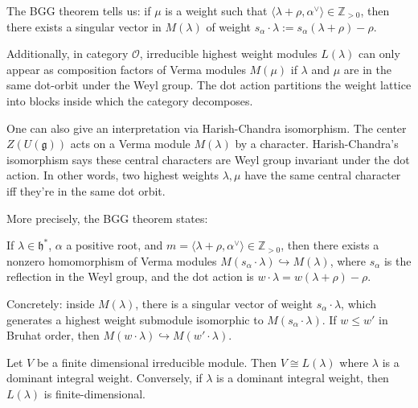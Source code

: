\documentclass[12pt]{article}
\begin{document}
\begin{remark}
     The BGG theorem tells us: if $\mu$ is a weight such that $\langle \lambda+\rho,\alpha^\vee\rangle \in \mathbb{Z}_{>0}$, then there exists a singular vector in $M(\lambda)$ of weight $s_\alpha\cdot\lambda := s_\alpha(\lambda+\rho)-\rho$.

    Additionally, in category $\mathcal{O}$, irreducible highest weight modules $L(\lambda)$ can only appear as composition factors of Verma modules $M(\mu)$ if $\lambda$ and $\mu$ are in the same dot-orbit under the Weyl group. The dot action partitions the weight lattice into blocks inside which the category decomposes.

    One can also give an interpretation via Harish-Chandra isomorphism. The center $Z(U(\mathfrak{g}))$ acts on a Verma module $M(\lambda)$ by a character. Harish-Chandra's isomorphism says these central characters are Weyl group invariant under the dot action. In other words, two highest weights $\lambda,\mu$ have the same central character iff they're in the same dot orbit.
\end{remark}

More precisely, the BGG theorem states:
\begin{theorem}
    If $\lambda \in \mathfrak{h}^*$, $\alpha$ a positive root, and
    $m = \langle \lambda+\rho, \alpha^\vee\rangle \in \mathbb{Z}_{>0}$,
    then there exists a nonzero homomorphism of Verma modules
    $M(s_\alpha \cdot \lambda) \hookrightarrow M(\lambda)$,
    where $s_\alpha$ is the reflection in the Weyl group, and the dot action is
    $w \cdot \lambda = w(\lambda+\rho) - \rho$.


    Concretely: inside $M(\lambda)$, there is a singular vector of weight $s_\alpha \cdot \lambda$, which generates a highest weight submodule isomorphic to $M(s_\alpha \cdot \lambda)$. If $w \leq w'$ in Bruhat order, then $M(w \cdot \lambda) \hookrightarrow M(w' \cdot \lambda)$.
\end{theorem}

\begin{theorem}\label{thm:fd-classification}
    Let $V$ be a finite dimensional irreducible module. Then
    $V \cong L(\lambda)$ where $\lambda$ is a dominant integral weight.
    Conversely, if $\lambda$ is a dominant integral weight, then $L(\lambda)$
    is finite-dimensional.
\end{theorem}
\end{document}
